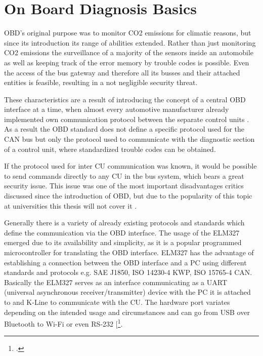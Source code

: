 

\chapter{On Board Diagnosis Basics}
\label{sec:OBDBASICS}
OBD's original purpose was to monitor CO2 emissions for climatic reasons, but since its introduction its range of abilities 
extended. Rather than just monitoring CO2 emissions the surveillance of a majority of the sensors inside an automobile as well as 
keeping track of the error memory by trouble codes is possible. Even the access of the bus gateway and therefore all its busses and 
their attached entities is feasible, resulting in a not negligible security threat. 

These characteristics are a result of introducing the concept of a central OBD interface at a time, 
when almost every automotive manufacturer already implemented own communication protocol between the separate control units \cite{SCHAFOBD1}.
As a result the OBD standard does not define a specific protocol used for the CAN bus but only the protocol used to communicate with the diagnostic 
section of a control unit, where standardized trouble codes can be obtained. 

If the protocol used for inter CU communication was known, it would be possible to send commands directly to any CU in the bus system, which bears a 
great security issue. This issue was one of the most important disadvantages critics discussed since the introduction of OBD, but due to the
popularity of this topic at universities this thesis will not cover it \cite{Koscher2010}.

Generally there is a variety of already existing protocols and standards which define the communication via the OBD interface. The usage of the ELM327 
emerged due to its availability and simplicity, as it is a popular programmed microcontroller for translating the OBD interface. ELM327 has the 
advantage of establishing a connection between the OBD interface and a PC using different standards and protocols e.g. SAE J1850, ISO 14230-4 KWP, 
ISO 15765-4 CAN. Basically the ELM327 serves as an interface communicating as a UART (universal asynchronous receiver/transmitter) device with the 
PC it is attached to and K-Line to communicate with the CU. The hardware port variates depending on the intended usage and circumstances and can go 
from USB over Bluetooth to Wi-Fi or even RS-232 [\footcite[pp. 46 ff.]{SCHAFOBD2}.

